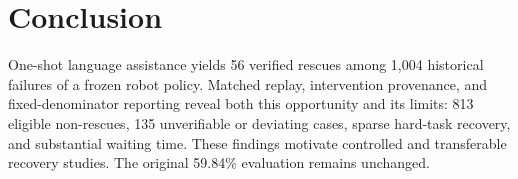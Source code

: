 \documentclass[10pt,twocolumn,letterpaper]{article}
\begin{document}
\section{Conclusion}
One-shot language assistance yields 56 verified rescues among 1,004 historical failures of a frozen robot policy. Matched replay, intervention provenance, and fixed-denominator reporting reveal both this opportunity and its limits: 813 eligible non-rescues, 135 unverifiable or deviating cases, sparse hard-task recovery, and substantial waiting time. These findings motivate controlled and transferable recovery studies. The original 59.84\% evaluation remains unchanged.

{\small}
\end{document}
